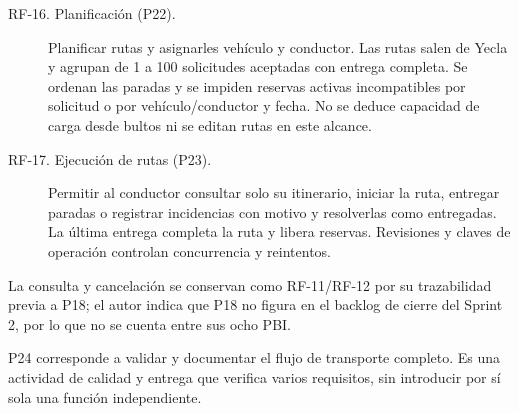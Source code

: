 \begin{description}
\item[RF-16. Planificación (P22).] Planificar rutas y asignarles vehículo y conductor. Las rutas salen de Yecla y agrupan de 1 a 100 solicitudes aceptadas con entrega completa. Se ordenan las paradas y se impiden reservas activas incompatibles por solicitud o por vehículo/conductor y fecha. No se deduce capacidad de carga desde bultos ni se editan rutas en este alcance.
\item[RF-17. Ejecución de rutas (P23).] Permitir al conductor consultar solo su itinerario, iniciar la ruta, entregar paradas o registrar incidencias con motivo y resolverlas como entregadas. La última entrega completa la ruta y libera reservas. Revisiones y claves de operación controlan concurrencia y reintentos.
\end{description}
La consulta y cancelación se conservan como RF-11/RF-12 por su trazabilidad previa a P18; el autor indica que P18 no figura en el backlog de cierre del Sprint 2, por lo que no se cuenta entre sus ocho PBI.

P24 corresponde a validar y documentar el flujo de transporte completo. Es una actividad de calidad y entrega que verifica varios requisitos, sin introducir por sí sola una función independiente.

